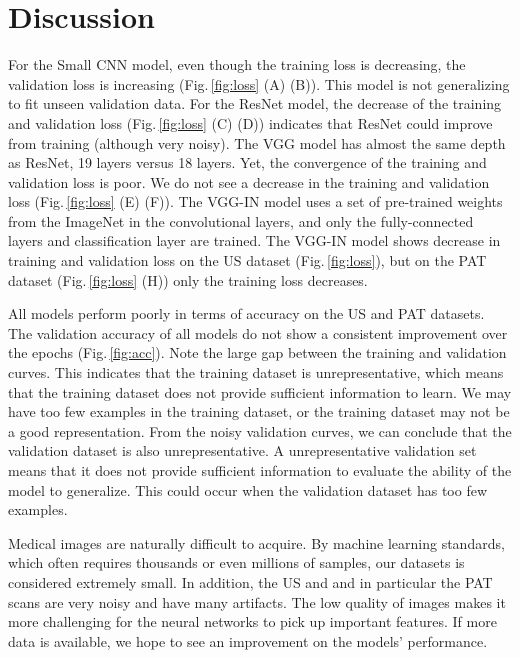 \section{Discussion}
\label{result_discussion}

For the Small CNN model, even though the training loss is decreasing, the validation loss is increasing (Fig.\,\ref{fig:loss} (A) (B)). This model is not generalizing to fit unseen validation data. For the ResNet model, the decrease of the training and validation loss (Fig.\,\ref{fig:loss} (C) (D)) indicates that ResNet could improve from training (although very noisy). The VGG model has almost the same depth as ResNet, 19 layers versus 18 layers. Yet, the convergence of the training and validation loss is poor. We do not see a decrease in the training and validation loss (Fig.\,\ref{fig:loss} (E) (F)). The VGG-IN model uses a set of pre-trained weights from the ImageNet \citep{imagenet_cvpr09} in the convolutional layers, and only the fully-connected layers and classification layer are trained. The VGG-IN model shows decrease in training and validation loss on the US dataset (Fig.\,\ref{fig:loss}), but on the PAT dataset (Fig.\,\ref{fig:loss} (H)) only the training loss decreases.

All models perform poorly in terms of accuracy on the US and PAT datasets. The validation accuracy of all models do not show a consistent improvement over the epochs (Fig.\,\ref{fig:acc}). Note the large gap between the training and validation curves. This indicates that the training dataset is unrepresentative, which means that the training dataset does not provide sufficient information to learn. We may have too few examples in the training dataset, or the training dataset may not be a good representation. From the noisy validation curves, we can conclude that the validation dataset is also unrepresentative. A unrepresentative validation set means that it does not provide sufficient information to evaluate the ability of the model to generalize. This could occur when the validation dataset has too few examples.

Medical images are naturally difficult to acquire. By machine learning standards, which often requires thousands or even millions of samples, our datasets is considered extremely small. In addition, the US and and in particular the PAT scans are very noisy and have many artifacts. The low quality of images makes it more challenging for the neural networks to pick up important features. If more data is available, we hope to see an improvement on the models' performance.

